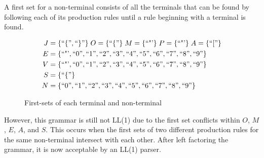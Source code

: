 \begin{definition}
    A first set for a non-terminal consists of all the terminals that can be found by following each of its production rules until a rule beginning with a terminal is found.
\end{definition}

\begin{figure}[H]
    \begin{center}
        \begin{equation}
            \begin{split}
                J &= \{``\{", ``\}"\}\;
                O = \{ ``\{" \}\;
                M = \{ \text{``"'} \}\;
                P = \{ \text{``"'} \}\;
                A = \{ ``[" \}\\
                E &= \{ \text{``"'}, ``0", ``1", ``2", ``3", ``4", ``5", ``6", ``7", ``8", ``9" \}\\
                V &= \{ \text{``"'}, ``0", ``1", ``2", ``3", ``4", ``5", ``6", ``7", ``8", ``9" \}\\
                S &= \{ ``\{" \}\\
                N &= \{``0", ``1", ``2", ``3", ``4", ``5", ``6", ``7", ``8", ``9" \}
            \end{split}
            \nonumber
        \end{equation}
    \end{center}
    \caption{\label{fig:2.8}First-sets of each terminal and non-terminal}
\end{figure}

However, this grammar is still not LL(1) due to the first set conflicts within $O$, $M$, $E$, $A$, and $S$. This occurs when the first sets of two different production rules for the same non-terminal intersect with each other. After left factoring the grammar, it is now acceptable by an LL(1) parser.

